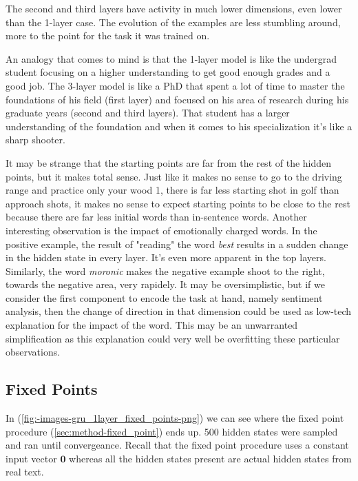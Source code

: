 \documentclass{article}
\begin{document}
The second and third layers have activity in much lower dimensions, even lower than the 1-layer case. The evolution of the examples are less stumbling around, more to the point for the task it was trained on. 

An analogy that comes to mind is that the 1-layer model is like the undergrad student focusing on a higher understanding to get good enough grades and a good job. The 3-layer model is like a PhD that spent a lot of time to master the foundations of his field (first layer) and focused on his area of research during his graduate years (second and third layers). That student has a larger understanding of the foundation and when it comes to his specialization it's like a sharp shooter. 

It may be strange that the starting points are far from the rest of the hidden points, but it makes total sense. Just like it makes no sense to go to the driving range and practice only your wood 1, there is far less starting shot in golf than approach shots, it makes no sense to expect starting points to be close to the rest because there are far less initial words than in-sentence words. Another interesting observation is the impact of emotionally charged words. In the positive example, the result of "reading" the word \textit{best} results in a sudden change in the hidden state in every layer. It's even more apparent in the top layers. Similarly, the word \textit{moronic} makes the negative example shoot to the right, towards the negative area, very rapidely. It may be oversimplistic, but if we consider the first component to encode the task at hand, namely sentiment analysis, then the change of direction in that dimension could be used as low-tech explanation for the impact of the word. This may be an unwarranted simplification as this explanation could very well be overfitting these particular observations.

\subsection{Fixed Points}
\label{subsec:fixed-points}

In (\ref{fig:-images-gru_1layer_fixed_points-png}) we can see where the fixed point procedure (\ref{sec:method-fixed_point}) ends up. 500 hidden states were sampled and ran until convergeance. Recall that the fixed point procedure uses a constant input vector $\textbf{0}$ whereas all the hidden states present are actual hidden states from real text.
\end{document}

